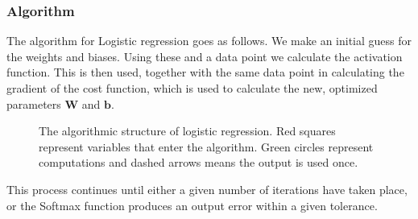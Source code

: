 \documentclass[11pt,a4paper,titlepage]{article}
\begin{document}
\subsubsection{Algorithm}
The algorithm for Logistic regression goes as follows. We make an initial guess for the weights and biases. Using these and a data point we calculate the activation function. This is then used, together with the same data point in calculating the gradient of the cost function, which is used to calculate the new, optimized parameters $\textbf{W}$ and $\textbf{b}$.
\begin{figure}[H]
\begin{center}
\end{center}
\caption[Logistic regression algorithm]{The algorithmic structure of logistic regression. Red squares represent variables that enter the algorithm. Green circles represent computations and dashed arrows means the output is used once.}
\label{LogisticRegressionDiagram}
\end{figure}
This process continues until either a given number of iterations have taken place, or the Softmax function produces an output error within a given tolerance. 
\end{document}

